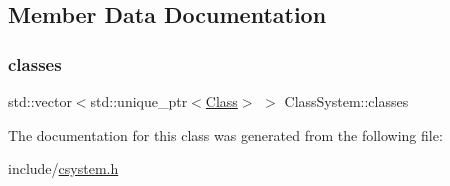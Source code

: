 \subsection{Member Data Documentation}
\mbox{\label{classClassSystem_afdfbb54eb10abf323371cb9bb4f639a2}} 
\subsubsection{\texorpdfstring{classes}{classes}}
{\footnotesize\ttfamily std\+::vector$<$std\+::unique\+\_\+ptr$<$\hyperlink{classClass}{Class}$>$ $>$ Class\+System\+::classes}



The documentation for this class was generated from the following file\+:\begin{DoxyCompactItemize}
\item 
include/\hyperlink{csystem_8h}{csystem.\+h}\end{DoxyCompactItemize}
